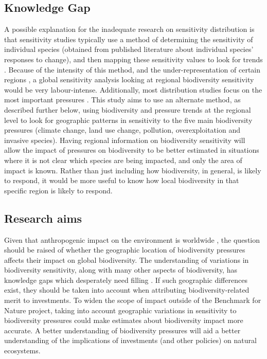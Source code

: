 \documentclass[11pt, a4paper, titlepage]{article}
\begin{document}
   	\subsection*{Knowledge Gap}
 	A possible explanation for the inadequate research on sensitivity distribution is that sensitivity studies typically use a method of determining the sensitivity of individual species (obtained from published literature about individual species' responses to change), and then mapping these sensitivity values to look for trends \citep{louette2010bioscore}. Because of the intensity of this method, and the under-representation of certain regions \citep{collen2008tropical}, a global sensitivity analysis looking at regional biodiversity sensitivity would be very labour-intense. Additionally, most distribution studies focus on the most important pressures \citep{ferrier2016summary}. This study aims to use an alternate method, as described further below, using biodiversity and pressure trends at the regional level to look for geographic patterns in sensitivity to the five main biodiversity pressures (climate change, land use change, pollution, overexploitation and invasive species). Having regional information on biodiversity sensitivity will allow the impact of pressures on biodiversity to be better estimated in situations where it is not clear which species are being impacted, and only the area of impact is known. Rather than just including how biodiversity, in general, is likely to respond, it would be more useful to know how local biodiversity in that specific region is likely to respond. 
   	 

   	\subsection*{Research aims}
   	
   	 Given that anthropogenic impact on the environment is worldwide \citep{plumptre2021might}, the question should be raised of whether the geographic location of biodiversity pressures affects their impact on global biodiversity. The understanding of variations in biodiversity sensitivity, along with many other aspects of biodiversity, has knowledge gaps which desperately need filling \citep{pereira2012global}. If such geographic differences exist, they should be taken into account when attributing biodiversity-related merit to investments. To widen the scope of impact outside of the Benchmark for Nature project, taking into account geographic variations in sensitivity to biodiversity pressures could make estimates about biodiversity impact more accurate. A better understanding of biodiversity pressures will aid a better understanding of the implications of investments (and other policies) on natural ecosystems.
   	 
\end{document}
